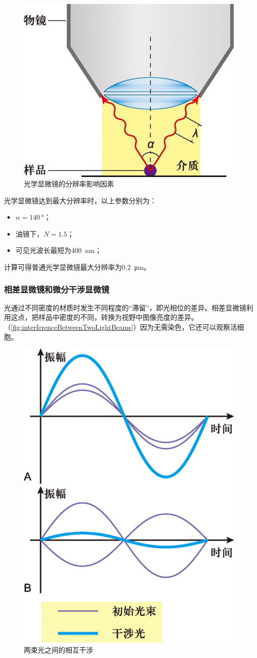 \begin{figure}[htbp]
	\centering
	\includegraphics[width=0.4\linewidth]{Pics/光学显微镜的分辨率影响因素}
	\caption{光学显微镜的分辨率影响因素}
	\label{fig:opticalMicroscopeResolutionInfluencingFactors}
\end{figure}

光学显微镜达到最大分辨率时，以上参数分别为：
\begin{itemize}
	\item $\alpha=\SI{140}{\degree}$；
	\item 油镜下，$N=1.5$；
	\item 可见光波长最短为\SI{400}{\nm}；
\end{itemize}

计算可得普通光学显微镜最大分辨率为\SI{0.2}{\um}。

\subsubsection{相差显微镜和微分干涉显微镜}

光通过不同密度的材质时发生不同程度的“滞留”，即光相位的差异。相差显微镜利用这点，把样品中密度的不同，转换为视野中图像亮度的差异。（\autoref{fig:interferenceBetweenTwoLightBeams}）因为无需染色，它还可以观察活细胞。

\begin{figure}[htbp]
	\centering
	\includegraphics[width=0.3\linewidth]{Pics/两束光之间的相互干涉}
	\caption{两束光之间的相互干涉}
	\label{fig:interferenceBetweenTwoLightBeams}
\end{figure}

